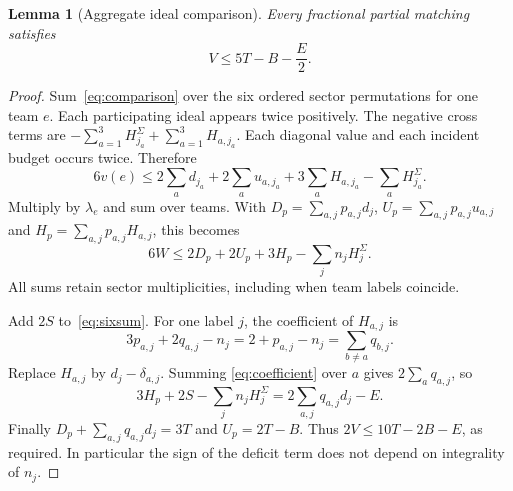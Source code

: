\documentclass[11pt]{article}
\newtheorem{lemma}[theorem]{Lemma}
\theoremstyle{remark}
\begin{document}
\begin{lemma}[Aggregate ideal comparison]\label{lem:aggregate}
Every fractional partial matching satisfies
\begin{equation}\label{eq:aggregate}
                          V\le5T-B-\frac E2.
\end{equation}
\end{lemma}
\begin{proof}
Sum~\eqref{eq:comparison} over the six ordered sector permutations for
one team $e$. Each participating ideal appears twice positively. The
negative cross terms are
$-\sum_{a=1}^3 H_{j_a}^\Sigma+\sum_{a=1}^3H_{a,j_a}$.
Each diagonal value and each incident budget occurs twice. Therefore
\[
 6v(e)\le2\sum_ad_{j_a}+2\sum_au_{a,j_a}
             +3\sum_aH_{a,j_a}-\sum_aH_{j_a}^\Sigma.
\]
Multiply by $\lambda_e$ and sum over teams. With
$D_p=\sum_{a,j}p_{a,j}d_j$, $U_p=\sum_{a,j}p_{a,j}u_{a,j}$ and
$H_p=\sum_{a,j}p_{a,j}H_{a,j}$, this becomes
\begin{equation}\label{eq:sixsum}
                     6W\le2D_p+2U_p+3H_p-\sum_jn_jH_j^\Sigma.
\end{equation}
All sums retain sector multiplicities, including when team labels coincide.

Add $2S$ to~\eqref{eq:sixsum}. For one label $j$, the coefficient of
$H_{a,j}$ is
\begin{equation}\label{eq:coefficient}
 3p_{a,j}+2q_{a,j}-n_j
       =2+p_{a,j}-n_j=\sum_{b\ne a}q_{b,j}.
\end{equation}
Replace $H_{a,j}$ by $d_j-\delta_{a,j}$. Summing
\eqref{eq:coefficient} over $a$ gives $2\sum_aq_{a,j}$, so
\[
 3H_p+2S-\sum_jn_jH_j^\Sigma
       =2\sum_{a,j}q_{a,j}d_j-E.
\]
Finally $D_p+\sum_{a,j}q_{a,j}d_j=3T$ and $U_p=2T-B$.
Thus $2V\le10T-2B-E$, as required. In particular the sign of the
deficit term does not depend on integrality of $n_j$.
\end{proof}
\end{document}

